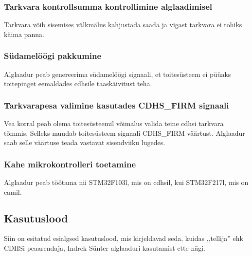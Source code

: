 \documentclass[12pt,a4paper]{article}
\begin{document}
\subsubsection{Tarkvara kontrollsumma kontrollimine alglaadimisel}
Tarkvara võib sisemises välkmälus kahjustada saada ja vigast tarkvara ei tohiks
käima panna.

\subsubsection{Südamelöögi pakkumine}
Alglaadur peab genereerima südamelöögi signaali, et toitesüsteem ei püüaks
toitepinget eemaldades \gls{cdhs}ile taaskäivitust teha.

\subsubsection{Tarkvarapesa valimine kasutades CDHS\_FIRM signaali}
Vea korral peab olema toitesüsteemil võimalus valida teine \gls{cdhs}i tarkvara
tõmmis. Selleks muudab toitesüsteem signaali CDHS\_FIRM väärtust. Alglaadur
saab selle väärtuse teada vastavat sisendviiku lugedes.

\subsubsection{Kahe mikrokontrolleri toetamine}
Alglaadur peab töötama nii STM32F103l, mis on \gls{cdhs}il, kui STM32F217l, mis
on \gls{cam}il.

\subsection{Kasutuslood}
Siin on esitatud esialgsed kasutuslood, mis kirjeldavad seda, kuidas ,,tellija''
ehk CDHSi peaarendaja, Indrek Sünter alglaaduri kasutamist ette nägi.
\end{document}

